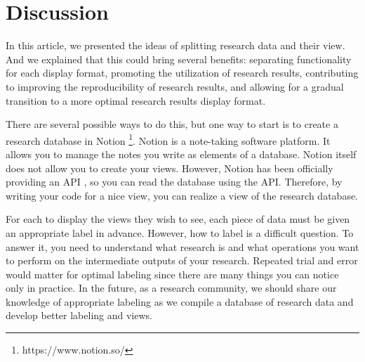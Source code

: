 \documentclass{article}
\begin{document}
\section{Discussion}
In this article, we presented the ideas of splitting research data and their view. And we explained that this could bring several benefits: separating functionality for each display format, promoting the utilization of research results, contributing to improving the reproducibility of research results, and allowing for a gradual transition to a more optimal research results display format.

There are several possible ways to do this, but one way to start is to create a research database in Notion \footnote{https://www.notion.so/}. Notion is a note-taking software platform. It allows you to manage the notes you write as elements of a database. Notion itself does not allow you to create your views. However, Notion has been officially providing an API \cite{notionapi}, so you can read the database using the API. Therefore, by writing your code for a nice view, you can realize a view of the research database.

For each to display the views they wish to see, each piece of data must be given an appropriate label in advance. However, how to label is a difficult question. To answer it, you need to understand what research is and what operations you want to perform on the intermediate outputs of your research. Repeated trial and error would matter for optimal labeling since there are many things you can notice only in practice. In the future, as a research community, we should share our knowledge of appropriate labeling as we compile a database of research data and develop better labeling and views.





\end{document}
